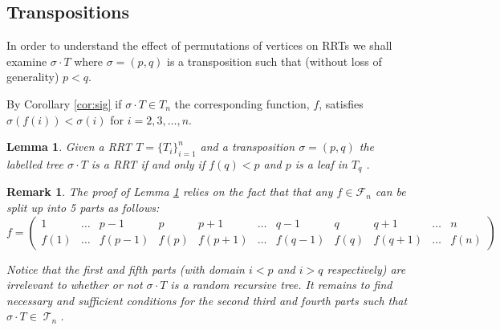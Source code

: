 \documentclass[10pt]{amsart} %
\newtheorem{remk}{Remark}
\newtheorem{lem}[thm]{Lemma}
\theoremstyle{definition}
\DeclareMathOperator{\T}{\mathcal{T}}
\begin{document}
\subsection{Transpositions}
In order to understand the effect of permutations of vertices on RRTs we shall examine $\sigma \cdot T$ where $\sigma = (p,q)$ is a transposition such that (without loss of generality) $p <q$.

By Corollary \ref{cor:sig} if $\sigma \cdot T \in T_n$ the corresponding function, $f$, satisfies $\sigma(f(i)) < \sigma(i)$ for $i = 2,3,\dots,n$.  

\begin{lem}\label{lem:rrtperm}
Given a RRT $T = \{T_{i}\}_{i=1}^{n}$ and a transposition $\sigma  = (p,q)$ the labelled tree $\sigma  \cdot T$ is a RRT if and only if $f(q)< p$ and $p$ is a leaf in $T_q$ .   
\end{lem}
\begin{remk}\label{remk:split}
The proof of  Lemma \ref{lem:rrtperm} relies on the fact that that any  $f \in \mathcal{F}_n$  can be split up into 5 parts as follows:
 \[ f = \left(\begin{array}{ccc|c|ccc|c|ccc}
     1    & \dots & p-1    &   p  & p+1    & \dots & q-1    & q    & q+1    & \dots & n \\
     f(1) & \dots & f(p-1) & f(p) & f(p+1) & \dots & f(q-1) & f(q) & f(q+1) & \dots & f(n)
    \end{array} \right)
\]

Notice that the first and fifth parts (with domain $i < p$ and $i > q$ respectively) are irrelevant to whether or not $\sigma \cdot T$ is a random recursive tree.  It remains to find necessary and sufficient conditions for the second third and fourth parts such that $\sigma \cdot T \in \T_n$.   

\end{remk}
\end{document}
